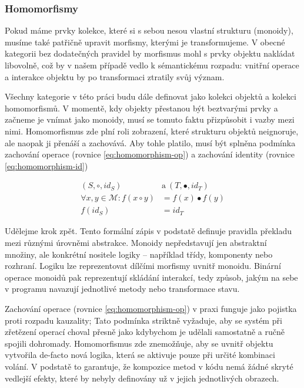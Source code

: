 \documentclass[FM,DP,fonts]{tulthesis}
\begin{document}
\subsubsection{Homomorfismy}
Pokud máme prvky kolekce, které si s sebou nesou vlastní strukturu (monoidy), musíme také patřičně upravit morfismy, kterými je transformujeme. V obecné kategorii bez dodatečných pravidel by morfismus mohl s prvky objektu nakládat libovolně, což by v našem případě vedlo k sémantickému rozpadu: vnitřní operace a interakce objektu by po transformaci ztratily svůj význam.

Všechny kategorie v této práci budu dále definovat jako kolekci objektů a kolekci homomorfismů. V momentě, kdy objekty přestanou být beztvarými prvky a začneme je vnímat jako monoidy, musí se tomuto faktu přizpůsobit i vazby mezi nimi. Homomorfismus zde plní roli zobrazení, které strukturu objektů neignoruje, ale naopak ji přenáší a zachovává. Aby tohle platilo, musí být splněna podmínka zachování operace (rovnice \ref{eq:homomorphism-op}) a zachování identity (rovnice \ref{eq:homomorphism-id})

\begin{align}
	(S, \circ, id_S)\                          & \text{a}\ (T, \bullet, id_T)                   \\
	\forall x, y \in \mathcal{M}: f(x \circ y) & = f(x) \bullet f(y) \label{eq:homomorphism-op} \\
	f(id_S)                                    & = id_T \label{eq:homomorphism-id}
\end{align}

Udělejme krok zpět. Tento formální zápis v podstatě definuje pravidla překladu mezi různými úrovněmi abstrakce. Monoidy nepředstavují jen abstraktní množiny, ale konkrétní nositele logiky – například třídy, komponenty nebo rozhraní. Logiku lze reprezentovat dílčími morfismy uvnitř monoidu. Binární operace monoidů pak reprezentují skládání interakcí, tedy způsob, jakým na sebe v programu navazují jednotlivé metody nebo transformace stavu.

Zachování operace (rovnice \ref{eq:homomorphism-op}) v praxi funguje jako pojistka proti rozpadu kauzality; Tato podmínka striktně vyžaduje, aby se systém při zřetězení operací choval přesně jako kdybychom je udělali samostatně a ručně spojili dohromady. Homomorfismus zde znemožňuje, aby se uvnitř objektu vytvořila de-facto nová logika, která se aktivuje pouze při určité kombinaci volání. V podstatě to garantuje, že kompozice metod v kódu nemá žádné skryté vedlejší efekty, které by nebyly definovány už v jejich jednotlivých obrazech.
\end{document}
